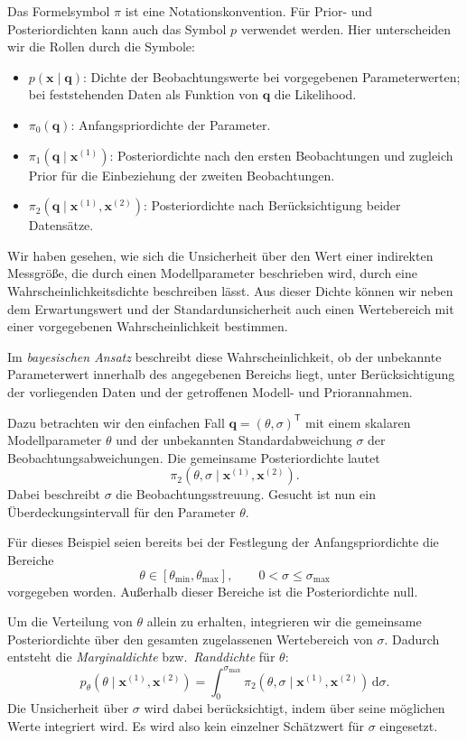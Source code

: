 Das Formelsymbol $\pi$ ist eine Notationskonvention.
Für Prior- und Posteriordichten kann auch das Symbol $p$
verwendet werden. Hier unterscheiden wir die Rollen durch
die Symbole:
\begin{itemize}
\item $p(\mathbf x\mid\mathbf q)$:
Dichte der Beobachtungswerte bei vorgegebenen Parameterwerten;
bei feststehenden Daten als Funktion von $\mathbf q$
die Likelihood.
\item $\pi_0(\mathbf q)$:
Anfangspriordichte der Parameter.
\item $\pi_1(\mathbf q\mid\mathbf x^{(1)})$:
Posteriordichte nach den ersten Beobachtungen und zugleich
Prior für die Einbeziehung der zweiten Beobachtungen.
\item $\pi_2(\mathbf q\mid\mathbf x^{(1)},\mathbf x^{(2)})$:
Posteriordichte nach Berücksichtigung beider Datensätze.
\end{itemize}


Wir haben gesehen, wie sich die Unsicherheit über den Wert
einer indirekten Messgröße, die durch einen Modellparameter
beschrieben wird, durch eine Wahrscheinlichkeitsdichte
beschreiben lässt. Aus dieser Dichte können wir neben dem
Erwartungswert und der Standardunsicherheit auch einen
Wertebereich mit einer vorgegebenen Wahrscheinlichkeit bestimmen.

Im \textsl{bayesischen Ansatz} beschreibt diese Wahrscheinlichkeit,
ob der unbekannte Parameterwert innerhalb des angegebenen
Bereichs liegt, unter Berücksichtigung der vorliegenden Daten
und der getroffenen Modell- und Priorannahmen.

Dazu betrachten wir den einfachen Fall
$\mathbf q=(\theta,\sigma)^{\mathsf T}$ mit einem skalaren
Modellparameter $\theta$ und der unbekannten
Standardabweichung $\sigma$ der Beobachtungsabweichungen.
Die gemeinsame Posteriordichte lautet
$$
\pi_2(\theta,\sigma\mid\mathbf x^{(1)},\mathbf x^{(2)}).
$$
Dabei beschreibt $\sigma$ die Beobachtungsstreuung.
Gesucht ist nun ein Überdeckungsintervall für den
Parameter $\theta$.


Für dieses Beispiel seien bereits bei der Festlegung der
Anfangspriordichte die Bereiche
$$
\theta\in[\theta_{\mathrm{min}},\theta_{\mathrm{max}}],
\qquad
0<\sigma\leq\sigma_{\mathrm{max}}
$$
vorgegeben worden. Außerhalb dieser Bereiche ist die
Posteriordichte null.

Um die Verteilung von $\theta$ allein zu erhalten,
integrieren wir die gemeinsame Posteriordichte über den
gesamten zugelassenen Wertebereich von $\sigma$.
Dadurch entsteht die \textsl{Marginaldichte} bzw.\
\textsl{Randdichte} für $\theta$:
\begin{equation}
p_{\theta}(\theta\mid\mathbf x^{(1)},\mathbf x^{(2)})
=
\int_0^{\sigma_{\mathrm{max}}}
\pi_2(\theta,\sigma\mid\mathbf x^{(1)},\mathbf x^{(2)})
\,\mathrm d\sigma.
\label{eq:marginaldichtethetaposterior}
\end{equation}
Die Unsicherheit über $\sigma$ wird dabei berücksichtigt,
indem über seine möglichen Werte integriert wird.
Es wird also kein einzelner Schätzwert für $\sigma$ eingesetzt.

